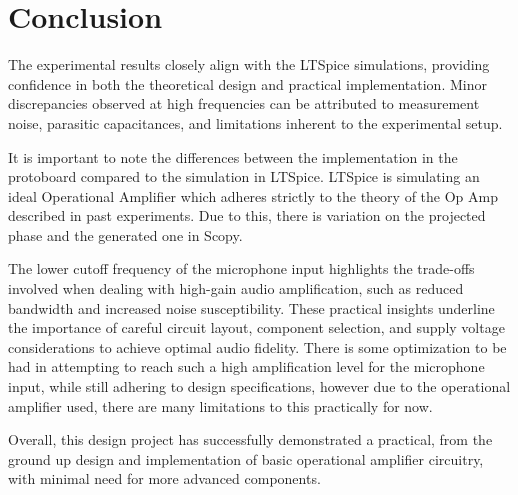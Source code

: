 \documentclass[12pt]{article}
\begin{document}
\section{Conclusion}
The experimental results closely align with the LTSpice simulations, providing confidence in both the theoretical design and practical implementation. Minor discrepancies observed at high frequencies can be attributed to measurement noise, parasitic capacitances, and limitations inherent to the experimental setup.

It is important to note the differences between the implementation in the
protoboard compared to the simulation in LTSpice. LTSpice is simulating an ideal
Operational Amplifier which adheres strictly to the theory of the Op Amp
described in past experiments. Due to this, there is variation on the projected
phase and the generated one in Scopy.

The lower cutoff frequency of the microphone input highlights the trade-offs
involved when dealing with high-gain audio amplification, such as reduced
bandwidth and increased noise susceptibility. These practical insights underline
the importance of careful circuit layout, component selection, and supply
voltage considerations to achieve optimal audio fidelity. There is some
optimization to be had in attempting to reach such a high amplification level
for the microphone input, while still adhering to design specifications, however
due to the operational amplifier used, there are many limitations to this
practically for now.

Overall, this design project has successfully demonstrated a practical, from the
ground up design and implementation of basic operational amplifier circuitry,
with minimal need for more advanced components.
\end{document}
